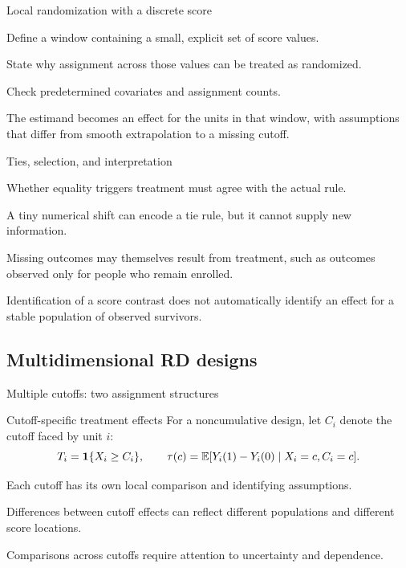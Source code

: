 \begin{frame}{Local randomization with a discrete score}
\begin{items}
\item Define a window containing a small, explicit set of score values.
\item State why assignment across those values can be treated as randomized.
\item Check predetermined covariates and assignment counts.
\item The estimand becomes an effect for the units in that window, with assumptions that differ from smooth extrapolation to a missing cutoff.
\end{items}
\end{frame}

\begin{frame}{Ties, selection, and interpretation}
\begin{items}
\item Whether equality triggers treatment must agree with the actual rule.
\item A tiny numerical shift can encode a tie rule, but it cannot supply new information.
\item Missing outcomes may themselves result from treatment, such as outcomes observed only for people who remain enrolled.
\item Identification of a score contrast does not automatically identify an effect for a stable population of observed survivors.
\end{items}
\end{frame}

\subsection{Multidimensional RD designs}
\begin{frame}{Multiple cutoffs: two assignment structures}
\end{frame}

\begin{frame}{Cutoff-specific treatment effects}
For a noncumulative design, let $C_i$ denote the cutoff faced by unit $i$:
\[
T_i=\mathbf{1}\{X_i\geq C_i\},\qquad
\tau(c)=\mathbb{E}[Y_i(1)-Y_i(0)\mid X_i=c,C_i=c].
\]
\begin{items}
\item Each cutoff has its own local comparison and identifying assumptions.
\item Differences between cutoff effects can reflect different populations and different score locations.
\item Comparisons across cutoffs require attention to uncertainty and dependence.
\end{items}
\end{frame}

